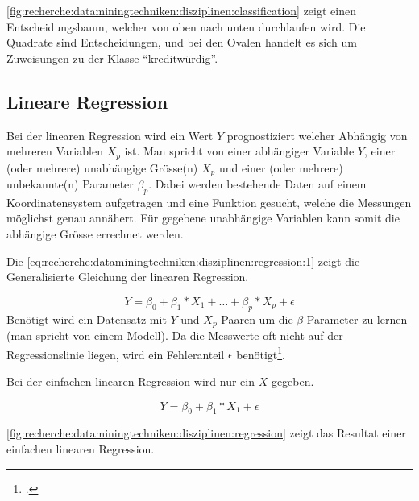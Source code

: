 \cref{fig:recherche:dataminingtechniken:disziplinen:classification} zeigt einen Entscheidungsbaum, welcher von oben nach unten durchlaufen wird. Die Quadrate sind Entscheidungen, und bei den Ovalen handelt es sich um Zuweisungen zu der Klasse "`kreditwürdig"'.


\subsection{Lineare Regression}
\label{sec:recherche:dataminingtechniken:disziplinen:regression}
Bei der linearen Regression wird ein Wert $Y$ prognostiziert welcher Abhängig von mehreren Variablen $X_p$ ist. Man spricht von einer abhängiger Variable $Y$, einer (oder mehrere) unabhängige Grösse(n) $X_p$ und einer (oder mehrere) unbekannte(n) Parameter $\beta_p$. Dabei werden bestehende Daten auf einem Koordinatensystem aufgetragen und eine Funktion gesucht, welche die Messungen möglichst genau annähert. Für gegebene unabhängige Variablen kann somit die abhängige Grösse errechnet werden.

Die \cref{eq:recherche:dataminingtechniken:disziplinen:regression:1} zeigt die Generalisierte Gleichung der linearen Regression.

\begin{equation} \label{eq:recherche:dataminingtechniken:disziplinen:regression:1}
Y = \beta_0 + \beta_1 * X_1 + \dots + \beta_p * X_p + \epsilon
\end{equation}
Benötigt wird ein Datensatz mit $Y$ und $X_p$ Paaren um die $\beta$ Parameter zu lernen (man spricht von einem Modell). Da die Messwerte oft nicht auf der Regressionslinie liegen, wird ein Fehleranteil $\epsilon$ benötigt\footcite{Einfache_lineare_Regression_2017-03-14}.

Bei der einfachen linearen Regression wird nur ein $X$ gegeben.

\begin{equation} \label{eq:recherche:dataminingtechniken:disziplinen:regression:2}
Y = \beta_0 + \beta_1 * X_1 + \epsilon
\end{equation}

\cref{fig:recherche:dataminingtechniken:disziplinen:regression} zeigt das Resultat einer einfachen linearen Regression.


